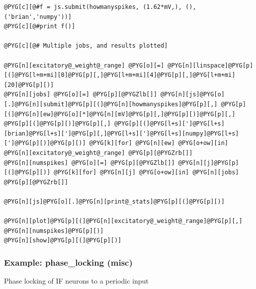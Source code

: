 \documentclass[letterpaper,10pt,english]{manual}
\begin{document}
\begin{Verbatim}[commandchars=@\[\]]
@PYG[c][@#f = js.submit(howmanyspikes, (1.62*mV,), (), ('brian','numpy'))]
@PYG[c][@#print f()]

@PYG[c][@# Multiple jobs, and results plotted]

@PYG[n][excitatory@_weight@_range] @PYG[o][=] @PYG[n][linspace]@PYG[p][(]@PYG[l+m+mi][0]@PYG[p][,]@PYG[l+m+mi][4]@PYG[p][,]@PYG[l+m+mi][20]@PYG[p][)]
@PYG[n][jobs] @PYG[o][=] @PYG[p][@PYGZlb[]] @PYG[n][js]@PYG[o][.]@PYG[n][submit]@PYG[p][(]@PYG[n][howmanyspikes]@PYG[p][,] @PYG[p][(]@PYG[n][ew]@PYG[o][*]@PYG[n][mV]@PYG[p][,]@PYG[p][)]@PYG[p][,] @PYG[p][(]@PYG[p][)]@PYG[p][,] @PYG[p][(]@PYG[l+s][']@PYG[l+s][brian]@PYG[l+s][']@PYG[p][,]@PYG[l+s][']@PYG[l+s][numpy]@PYG[l+s][']@PYG[p][)]@PYG[p][)] @PYG[k][for] @PYG[n][ew] @PYG[o+ow][in] @PYG[n][excitatory@_weight@_range] @PYG[p][@PYGZrb[]]
@PYG[n][numspikes] @PYG[o][=] @PYG[p][@PYGZlb[]] @PYG[n][j]@PYG[p][(]@PYG[p][)] @PYG[k][for] @PYG[n][j] @PYG[o+ow][in] @PYG[n][jobs] @PYG[p][@PYGZrb[]]

@PYG[n][js]@PYG[o][.]@PYG[n][print@_stats]@PYG[p][(]@PYG[p][)]

@PYG[n][plot]@PYG[p][(]@PYG[n][excitatory@_weight@_range]@PYG[p][,] @PYG[n][numspikes]@PYG[p][)]
@PYG[n][show]@PYG[p][(]@PYG[p][)]
\end{Verbatim}

\resetcurrentobjects
\hypertarget{--doc-examples-misc_phase_locking}{}

\hypertarget{index-57}{}\subsubsection{Example: phase\_locking (misc)}

Phase locking of IF neurons to a periodic input
\end{document}
